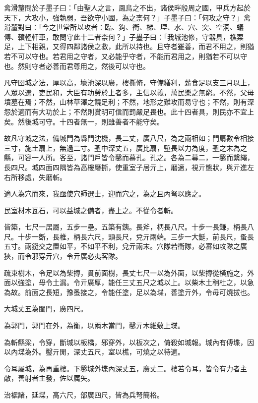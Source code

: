 
\begin{pinyinscope}
禽滑釐問於子墨子曰：「由聖人之言，鳳鳥之不出，諸侯畔殷周之國，甲兵方起於天下，大攻小，強執弱，吾欲守小國，為之柰何？」子墨子曰：「何攻之守？」禽滑釐對曰：「今之世常所以攻者：臨、鉤、衝、梯、堙、水、穴、突、空洞、蟻傅、轒轀軒車，敢問守此十二者柰何？」子墨子曰：「我城池修，守器具，樵粟足，上下相親，又得四鄰諸侯之救，此所以持也。且守者雖善，而君不用之，則猶若不可以守也。若君用之守者，又必能乎守者，不能而君用之，則猶若不可以守也。然則守者必善而君尊用之，然後可以守也。

凡守圉城之法，厚以高，壕池深以廣，樓撕脩，守備繕利，薪食足以支三月以上，人眾以選，吏民和，大臣有功勞於上者多，主信以義，萬民樂之無窮。不然，父母墳墓在焉；不然，山林草澤之饒足利；不然，地形之難攻而易守也；不然，則有深怨於適而有大功於上；不然則賞明可信而罰嚴足畏也。此十四者具，則民亦不宜上矣。然後城可守。十四者無一，則雖善者不能守矣。

故凡守城之法，備城門為縣門沈機，長二丈，廣八尺，為之兩相如；門扇數令相接三寸，施土扇上，無過二寸。塹中深丈五，廣比扇，塹長以力為度，塹之末為之縣，可容一人所。客至，諸門戶皆令鑿而慕孔。孔之。各為二幕二，一鑿而繫繩，長四尺。城四面四隅皆為高樓磿撕，使重室子居亓上，磿適，視亓態狀，與亓進左右所移處，失磿斬。

適人為穴而來，我亟使穴師選士，迎而穴之，為之且內弩以應之。

民室材木瓦石，可以益城之備者，盡上之。不從令者斬。

皆築，七尺一居屬，五步一壘。五築有銕。長斧，柄長八尺。十步一長鎌，柄長八尺。十步一斲，長椎，柄長六尺，頭長尺，兌亓兩端。三步一大鋌，前長尺，蚤長五寸。兩鋌交之置如平，不如平不利，兌亓兩末。穴隊若衝隊，必審如攻隊之廣狹，而令邪穿亓穴，令亓廣必夷客隊。

疏束樹木，令足以為柴摶，貫前面樹，長丈七尺一以為外面，以柴摶從橫施之，外面以強塗，毋令土漏。令亓廣厚，能任三丈五尺之城以上。以柴木土稍杜之，以急為故。前面之長短，豫蚤接之，令能任塗，足以為堞，善塗亓外，令毋可燒拔也。

大城丈五為閨門，廣四尺。

為郭門，郭門在外，為衡，以兩木當門，鑿亓木維敷上堞。

為斬縣梁，令穿，斷城以板橋，邪穿外，以板次之，倚殺如城報。城內有傅堞，因以內堞為外。鑿亓閒，深丈五尺，室以樵，可燒之以待適。

令耳屬城，為再重樓。下鑿城外堞內深丈五，廣丈二。樓若令耳，皆令有力者主敵，善射者主發，佐以厲矢。

治裾諸，延堞，高六尺，部廣四尺，皆為兵弩簡格。


\end{pinyinscope}
